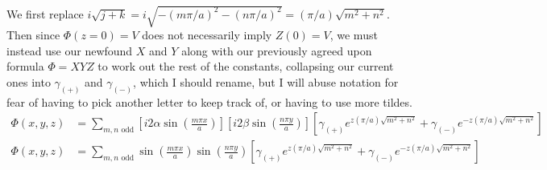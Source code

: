 \documentclass{article}
\begin{document}
\paragraph{}
We first replace $i\sqrt{j+k} = i\sqrt{-(m\pi/a)^{2} - (n\pi/a)^{2}} = (\pi/a)\sqrt{m^{2} + n^{2}}$. Then since $\Phi(z=0)=V$ does not necessarily imply $Z(0)=V$, we must instead use our newfound $X$ and $Y$ along with our previously agreed upon formula $\Phi=XYZ$ to work out the rest of the constants, collapsing our current ones into $\gamma_{(+)}$ and $\gamma_{(-)}$, which I should rename, but I will abuse notation for fear of having to pick another letter to keep track of, or having to use more tildes. 
\begin{align*}
\Phi(x,y,z) &= \sum_{m,n \text{ odd}}\left[i2\alpha \sin\left(\frac{ m\pi x }{ a }\right)\right] \left[ i2\beta \sin\left(\frac{ n\pi y }{ a }\right) \right] \left[ \gamma_{(+)}e^{z(\pi/a)\sqrt{m^{2} + n^{2}}}+\gamma_{(-)}e^{-z(\pi/a)\sqrt{m^{2} + n^{2}}} \right]\\
\Phi(x,y,z) &= \sum_{m,n \text{ odd}}\sin\left(\frac{ m\pi x }{ a }\right) \sin\left(\frac{ n\pi y }{ a }\right) \left[ \gamma_{(+)}e^{z(\pi/a)\sqrt{m^{2} + n^{2}}}+\gamma_{(-)}e^{-z(\pi/a)\sqrt{m^{2} + n^{2}}} \right]\\
\end{align*}
\end{document}
